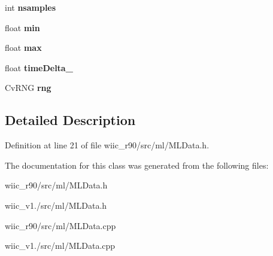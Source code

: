\begin{DoxyCompactItemize}
\item 
\hypertarget{class_m_l_data_a27537472d2a98ab0953e4274e0eacf26}{int {\bfseries nsamples}}\label{class_m_l_data_a27537472d2a98ab0953e4274e0eacf26}

\item 
\hypertarget{class_m_l_data_aff2c694344818958df194f79569afb5e}{float {\bfseries min}}\label{class_m_l_data_aff2c694344818958df194f79569afb5e}

\item 
\hypertarget{class_m_l_data_a8ab336f56b4c3dad7f07082e7382a09e}{float {\bfseries max}}\label{class_m_l_data_a8ab336f56b4c3dad7f07082e7382a09e}

\item 
\hypertarget{class_m_l_data_a73e0cdc6a204e1ce47f732c539d23386}{float {\bfseries time\-Delta\-\_\-}}\label{class_m_l_data_a73e0cdc6a204e1ce47f732c539d23386}

\item 
\hypertarget{class_m_l_data_acbcee1e8b631c755c2093665354104f2}{Cv\-R\-N\-G {\bfseries rng}}\label{class_m_l_data_acbcee1e8b631c755c2093665354104f2}

\end{DoxyCompactItemize}


\subsection{Detailed Description}


Definition at line 21 of file wiic\-\_\-r90/src/ml/\-M\-L\-Data.\-h.



The documentation for this class was generated from the following files\-:\begin{DoxyCompactItemize}
\item 
wiic\-\_\-r90/src/ml/\-M\-L\-Data.\-h\item 
wiic\-\_\-v1./src/ml/\-M\-L\-Data.\-h\item 
wiic\-\_\-r90/src/ml/\-M\-L\-Data.\-cpp\item 
wiic\-\_\-v1./src/ml/\-M\-L\-Data.\-cpp\end{DoxyCompactItemize}
